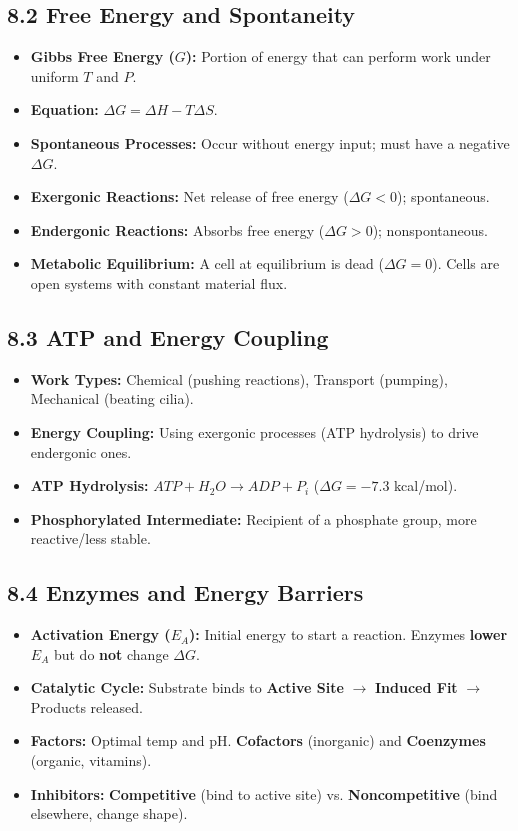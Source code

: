 \documentclass[11pt, a4paper]{article}
\begin{document}
\subsection*{8.2 Free Energy and Spontaneity}
\begin{itemize}
    \item \textbf{Gibbs Free Energy ($G$):} Portion of energy that can perform work under uniform $T$ and $P$.
    \item \textbf{Equation:} $\Delta G = \Delta H - T \Delta S$. 
    \item \textbf{Spontaneous Processes:} Occur without energy input; must have a negative $\Delta G$.
    \item \textbf{Exergonic Reactions:} Net release of free energy ($\Delta G < 0$); spontaneous.
    \item \textbf{Endergonic Reactions:} Absorbs free energy ($\Delta G > 0$); nonspontaneous.
    \item \textbf{Metabolic Equilibrium:} A cell at equilibrium is dead ($\Delta G = 0$). Cells are open systems with constant material flux.
\end{itemize}

\subsection*{8.3 ATP and Energy Coupling}
\begin{itemize}
    \item \textbf{Work Types:} Chemical (pushing reactions), Transport (pumping), Mechanical (beating cilia).
    \item \textbf{Energy Coupling:} Using exergonic processes (ATP hydrolysis) to drive endergonic ones.
    \item \textbf{ATP Hydrolysis:} $ATP + H_2O \rightarrow ADP + P_i$ ($\Delta G = -7.3$ kcal/mol).
    \item \textbf{Phosphorylated Intermediate:} Recipient of a phosphate group, more reactive/less stable.
\end{itemize}

\subsection*{8.4 Enzymes and Energy Barriers}
\begin{itemize}
    \item \textbf{Activation Energy ($E_A$):} Initial energy to start a reaction. Enzymes \textbf{lower} $E_A$ but do \textbf{not} change $\Delta G$.
    \item \textbf{Catalytic Cycle:} Substrate binds to \textbf{Active Site} $\rightarrow$ \textbf{Induced Fit} $\rightarrow$ Products released.
    \item \textbf{Factors:} Optimal temp and pH. \textbf{Cofactors} (inorganic) and \textbf{Coenzymes} (organic, vitamins).
    \item \textbf{Inhibitors:} \textbf{Competitive} (bind to active site) vs. \textbf{Noncompetitive} (bind elsewhere, change shape).
\end{itemize}
\end{document}
